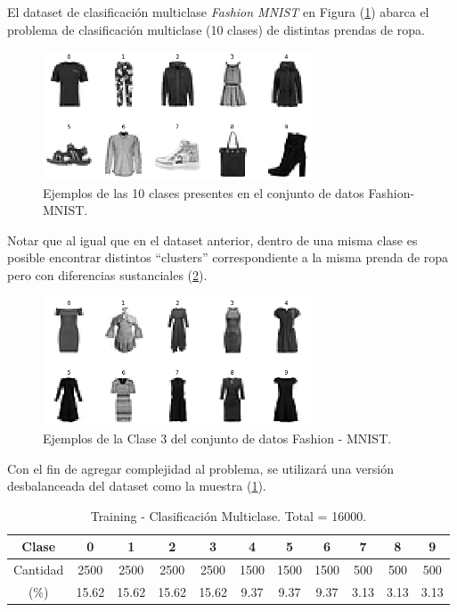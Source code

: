 El dataset de clasificación multiclase \textit{Fashion MNIST} en Figura (\ref{fig:fashion_mnist}) abarca el problema de clasificación multiclase (10 clases) de distintas prendas de ropa. 

\begin{figure}[ht]
    \centering
    \includegraphics[width=8cm]{img/tesis/fashion_mnist.png}
    \caption{Ejemplos de las 10 clases presentes en el conjunto de datos Fashion-MNIST.}
    \label{fig:fashion_mnist}
\end{figure}

\vspace{0.2cm}

Notar que al igual que en el dataset anterior, dentro de una misma clase es posible encontrar distintos ``clusters'' correspondiente a la misma prenda de ropa pero con diferencias sustanciales (\ref{fig:fashion_mnist_label_3}).

\vspace{0.2CM}

\begin{figure}[ht]
    \centering
    \includegraphics[width=8cm]{img/tesis/fashion_mnist_label_3.png}
    \caption{Ejemplos de la Clase 3 del conjunto de datos Fashion - MNIST.}
    \label{fig:fashion_mnist_label_3}
\end{figure}

Con el fin de agregar complejidad al problema, se utilizará una versión desbalanceada del dataset como la muestra (\ref{table:fashion_mnist}).

\begin{table}[ht]
\begin{tabular}{|c|c|c|c|c|c|c|c|c|c|c|}
\hline
Clase    & 0    & 1    & 2    & 3    & 4    & 5    & 6   & 7   & 8   & 9   \\ \hline
Cantidad & 2500 & 2500 & 2500 & 2500 & 1500 & 1500 & 1500 & 500 & 500 & 500 \\ \hline
(\%) & 15.62 & 15.62 & 15.62 & 15.62 & 9.37 & 9.37 & 9.37 & 3.13 & 3.13 & 3.13 \\ \hline
\end{tabular}
\caption{Training - Clasificación Multiclase. Total = 16000.}
\label{table:fashion_mnist}
\end{table}

